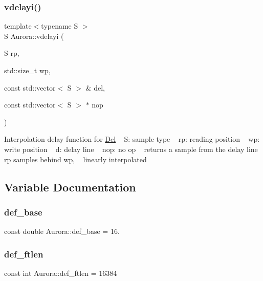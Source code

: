 \subsubsection{\texorpdfstring{vdelayi()}{vdelayi()}}
{\footnotesize\ttfamily template$<$typename S $>$ \\
S Aurora\+::vdelayi (\begin{DoxyParamCaption}\item[{S}]{rp,  }\item[{std\+::size\+\_\+t}]{wp,  }\item[{const std\+::vector$<$ S $>$ \&}]{del,  }\item[{const std\+::vector$<$ S $>$ $\ast$}]{nop }\end{DoxyParamCaption})\hspace{0.3cm}{\ttfamily [inline]}}

Interpolation delay function for \hyperlink{class_aurora_1_1_del}{Del} ~\newline
S\+: sample type ~\newline
rp\+: reading position ~\newline
wp\+: write position ~\newline
d\+: delay line ~\newline
nop\+: no op ~\newline
returns a sample from the delay line rp samples behind wp, ~\newline
linearly interpolated 

\subsection{Variable Documentation}
\mbox{\label{namespace_aurora_acb267dff62f74484893c2d5b679b78bf}} 
\subsubsection{\texorpdfstring{def\+\_\+base}{def\_base}}
{\footnotesize\ttfamily const double Aurora\+::def\+\_\+base = 16.}

\mbox{\label{namespace_aurora_a14dabfd9feedfa09c0e6f86d2627f006}} 
\subsubsection{\texorpdfstring{def\+\_\+ftlen}{def\_ftlen}}
{\footnotesize\ttfamily const int Aurora\+::def\+\_\+ftlen = 16384}

